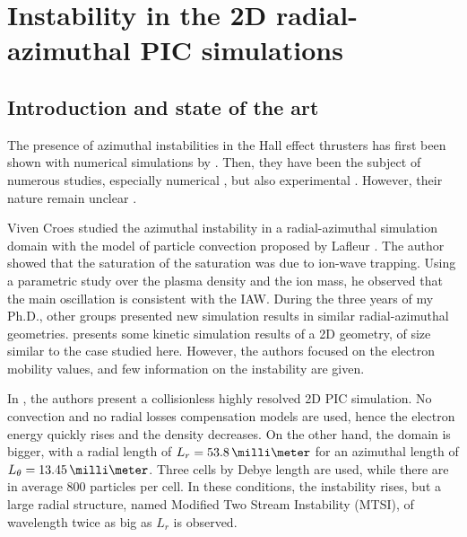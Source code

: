 
\section{Instability in the \acs{2D} radial-azimuthal \acs{PIC} simulations}
  \label{sec-PIC-ECDI}
  
  \subsection{Introduction and state of the art} \label{subsec-indroECDI}
        
    The presence of azimuthal instabilities in the Hall effect thrusters has first been shown with numerical simulations by \citet{adam2004}.
    Then, they have been the subject of numerous studies, especially numerical \citep{ducrocq2006,lafleur2016,lafleur2016a,croes2017,croes2018,janhunen2018,taccogna2019}, but also experimental \citep{honore2011,cavalier2013,cavalier2013a}.
    However, their nature remain unclear \citep{boeuf2018}.

    Viven Croes studied the azimuthal instability in a radial-azimuthal simulation domain with the model of particle convection proposed by Lafleur \citep{croes2017,croes2018}.
    The author showed that the saturation of the saturation was due to ion-wave trapping.
    Using a parametric study over the plasma density and the ion mass, he observed that the main oscillation is consistent with the \ac{IAW}.
    \vspace{1ex}
    During the three years of my Ph.D., other groups presented new simulation results in similar radial-azimuthal geometries.
    \citet{hara2019a} presents some kinetic simulation results of a \ac{2D} geometry, of size similar to the case studied here.
    However, the authors focused on the electron mobility values, and few information on the instability are given.
    
    In \citet{janhunen2018}, the authors present a collisionless highly resolved \ac{2D} \ac{PIC} simulation.
    No convection and no radial losses compensation models are used, hence the electron energy quickly rises and the density decreases.
    On the other hand, the domain is bigger, with a radial length of $L_r = 53.8\,\milli\meter$ for an azimuthal length of $L_{\theta} = 13.45 \,\milli\meter$.
    Three cells by Debye length are used, while there are in average 800 particles per cell.
    In these conditions, the instability rises, but a large radial structure, named Modified Two Stream Instability (MTSI), of wavelength twice as big as $L_r$  is observed.
    
